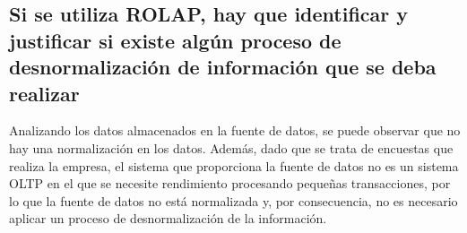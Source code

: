 \medskip
\subsection{Si se utiliza ROLAP, hay que identificar y justificar si existe algún proceso de desnormalización de información que se deba realizar}
Analizando los datos almacenados en la fuente de datos, se puede observar que no hay una normalización en los datos. Además, dado que se trata de encuestas que realiza la empresa, el sistema que proporciona la fuente de datos no es un sistema OLTP en el que se necesite rendimiento procesando pequeñas transacciones, por lo que la fuente de datos no está normalizada y, por consecuencia, no es necesario aplicar un proceso de desnormalización de la información.

